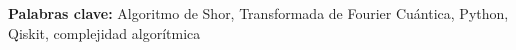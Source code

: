 \textbf{Palabras clave:} Algoritmo de Shor, Transformada de Fourier Cuántica, Python, Qiskit, complejidad algorítmica 